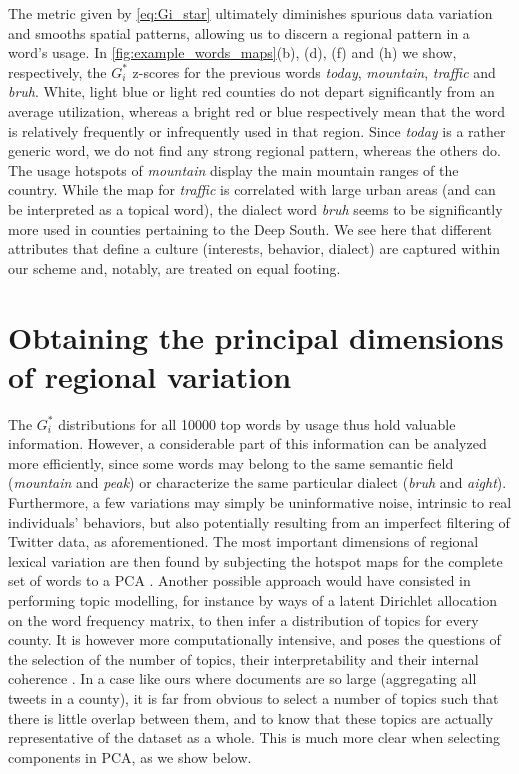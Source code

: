 \documentclass[../thesis.tex]{subfiles}
\begin{document}
The metric given by \cref{eq:Gi_star} ultimately diminishes spurious data variation and
smooths spatial patterns, allowing us to discern a regional pattern in a word's usage.
In \cref{fig:example_words_maps}(b), (d), (f) and (h) we show, respectively, the $G_i^*$
z-scores for the previous words \textit{today}, \textit{mountain}, \textit{traffic} and
\textit{bruh}. White, light blue or light red counties do not depart significantly from
an average utilization, whereas a bright red or blue respectively mean that the word is
relatively frequently or infrequently used in that region. Since \textit{today} is a
rather generic word, we do not find any strong regional pattern, whereas the others do.
The usage hotspots of \textit{mountain} display the main mountain ranges of the country.
While the map for \textit{traffic} is correlated with large urban areas (and can be
interpreted as a topical word), the dialect word \textit{bruh} seems to be significantly
more used in counties pertaining to the Deep South. We see here that different
attributes that define a culture (interests, behavior, dialect) are captured within our
scheme and, notably, are treated on equal footing.


\section{Obtaining the principal dimensions of regional variation}

The $G_i^*$ distributions for all \SI{10000}{} top words by usage thus hold valuable
information. However, a considerable part of this information can be analyzed more
efficiently, since some words may belong to the same semantic field (\textit{mountain}
and \textit{peak}) or characterize the same particular dialect (\textit{bruh} and
\textit{aight}). Furthermore, a few variations may simply be uninformative noise,
intrinsic to real individuals' behaviors, but also potentially resulting from an
imperfect filtering of Twitter data, as aforementioned. The most important dimensions of
regional lexical variation are then found by subjecting the hotspot maps for the
complete set of words to a \ac{PCA}
\cite{LieskeRegionalSubcultures1993,WoldPrincipalComponent1987}. Another possible
approach would have consisted in performing topic modelling, for instance by ways of a
latent Dirichlet allocation on the word frequency matrix, to then infer a distribution
of topics for every county. It is however more computationally intensive, and poses the
questions of the selection of the number of topics, their interpretability and their
internal coherence \cite{ArunFindingNatural2010,HasanNormalizedApproach2021}. In a case
like ours where documents are so large (aggregating all tweets in a county), it is far
from obvious to select a number of topics such that there is little overlap between
them, and to know that these topics are actually representative of the dataset as a
whole. This is much more clear when selecting components in \ac{PCA}, as we show
below.
\end{document}
